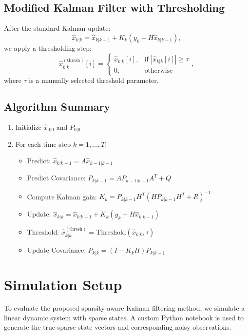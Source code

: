 \documentclass[12pt]{article}
\begin{document}
\subsection{Modified Kalman Filter with Thresholding}
After the standard Kalman update:
\begin{equation}
    \hat{x}_{k|k} = \hat{x}_{k|k-1} + K_k (y_k - H \hat{x}_{k|k-1}),
\end{equation}
we apply a thresholding step:
\begin{equation}
    \hat{x}_{k|k}^{(\text{thresh})}[i] =
    \begin{cases}
    \hat{x}_{k|k}[i], & \text{if } |\hat{x}_{k|k}[i]| \geq \tau \\
    0, & \text{otherwise}
    \end{cases},
\end{equation}
where $\tau$ is a manually selected threshold parameter.

\subsection{Algorithm Summary}
\begin{enumerate}
    \item Initialize $\hat{x}_{0|0}$ and $P_{0|0}$
    \item For each time step $k = 1, ..., T$:
    \begin{itemize}
        \item Predict: $\hat{x}_{k|k-1} = A \hat{x}_{k-1|k-1}$
        \item Predict Covariance: $P_{k|k-1} = A P_{k-1|k-1} A^T + Q$
        \item Compute Kalman gain: $K_k = P_{k|k-1} H^T (H P_{k|k-1} H^T + R)^{-1}$
        \item Update: $\hat{x}_{k|k} = \hat{x}_{k|k-1} + K_k (y_k - H \hat{x}_{k|k-1})$
        \item Threshold: $\hat{x}_{k|k}^{(\text{thresh})} = \text{Threshold}(\hat{x}_{k|k}, \tau)$
        \item Update Covariance: $P_{k|k} = (I - K_k H) P_{k|k-1}$
    \end{itemize}
\end{enumerate}


\section{Simulation Setup}

To evaluate the proposed sparsity-aware Kalman filtering method, we simulate a linear dynamic system with sparse states. A custom Python notebook is used to generate the true sparse state vectors and corresponding noisy observations.
\end{document}
